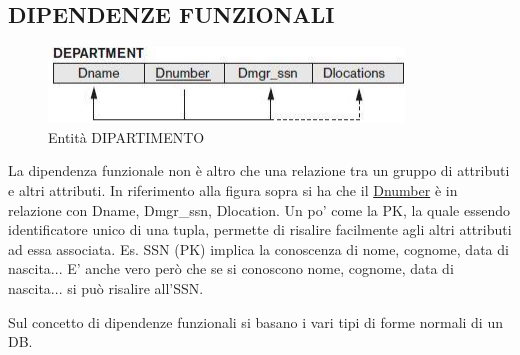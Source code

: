 \subsection{DIPENDENZE FUNZIONALI}

\begin{center}
\begin{figure}[H]
\centering
\includegraphics[scale=1]{figures/department_funcdep.png}
\caption{Entità DIPARTIMENTO}
\end{figure}
\end{center}

La dipendenza funzionale non è altro che una relazione tra un gruppo di attributi e altri attributi. In riferimento alla figura sopra si ha che il \underline{Dnumber} è in relazione con Dname, Dmgr\_ssn, Dlocation. Un po’ come la PK, la quale essendo identificatore unico di una tupla, permette di risalire facilmente agli altri attributi ad essa associata. 
Es. SSN (PK) implica la conoscenza di nome, cognome, data di nascita...
E’ anche vero però che se si conoscono nome, cognome, data di nascita... si può risalire all’SSN.  

Sul concetto di dipendenze funzionali si basano i vari tipi di forme normali di un DB. 

